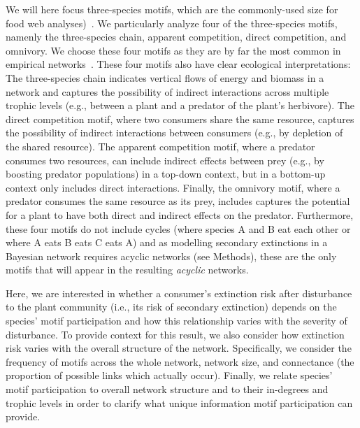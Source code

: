 \documentclass[12pt]{article}
\begin{document}
\begin{spacing}{2.0}
    We will here focus three-species motifs, which are the commonly-used size for food web analyses)~\citep{Milo2004,Stouffer2007,Stouffer2012,Cirtwill2015a}. We particularly analyze four of the three-species motifs, namenly the three-species chain, apparent competition, direct competition, and omnivory.
    We choose these four motifs as they are by far the most common in empirical networks~\citep{Stouffer2007, Borrelli2015a, giling2019plant}.
    These four motifs also have clear ecological interpretations:
    The three-species chain indicates vertical flows of energy and biomass in a network and captures the possibility of indirect interactions across multiple trophic levels (e.g., between a plant and a predator of the plant's herbivore).
    The direct competition motif, where two consumers share the same resource, captures the possibility of indirect interactions between consumers (e.g., by depletion of the shared resource). 
    The apparent competition motif, where a predator consumes two resources, can include indirect effects between prey (e.g., by boosting predator populations) in a top-down context, but in a bottom-up context only includes direct interactions.
    Finally, the omnivory motif, where a predator consumes the same resource as its prey, includes captures the potential for a plant to have both direct and indirect effects on the predator. 
    Furthermore, these four motifs do not include cycles (where species A and B eat each other or where A eats B eats C eats A) and as modelling secondary extinctions in a Bayesian network requires acyclic networks (see Methods), these are the only motifs that will appear in the resulting \emph{acyclic} networks.
    
    
    Here, we are interested in whether a consumer's extinction risk after disturbance to the plant community (i.e., its risk of secondary extinction) depends on the species' motif participation and how this relationship varies with the severity of disturbance.
    To provide context for this result, we also consider how extinction risk varies with the overall structure of the network.
    Specifically, we consider the frequency of motifs across the whole network, network size, and connectance (the proportion of possible links which actually occur).
    Finally, we relate species' motif participation to overall network structure and to their in-degrees and trophic levels in order to clarify what unique information motif participation can provide.



\end{spacing}
\end{document}

